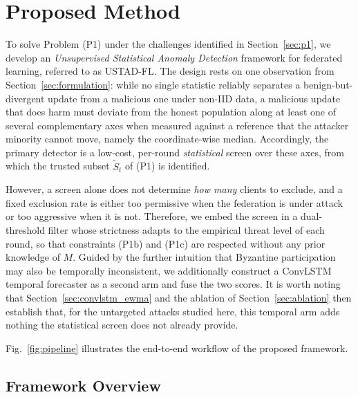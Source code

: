 \documentclass[journal]{IEEEtran}
\begin{document}
\section{Proposed Method}
\label{sec:method}

To solve Problem (P1) under the challenges identified in Section~\ref{sec:p1}, we develop an \emph{Unsupervised Statistical Anomaly Detection} framework for federated learning, referred to as USTAD-FL. The design rests on one observation from Section~\ref{sec:formulation}: while no single statistic reliably separates a benign-but-divergent update from a malicious one under non-IID data, a malicious update that does harm must deviate from the honest population along at least one of several complementary axes when measured against a reference that the attacker minority cannot move, namely the coordinate-wise median. Accordingly, the primary detector is a low-cost, per-round \emph{statistical} screen over these axes, from which the trusted subset $\widetilde{S}_t$ of (P1) is identified.

However, a screen alone does not determine \emph{how many} clients to exclude, and a fixed exclusion rate is either too permissive when the federation is under attack or too aggressive when it is not. Therefore, we embed the screen in a dual-threshold filter whose strictness adapts to the empirical threat level of each round, so that constraints (P1b) and (P1c) are respected without any prior knowledge of $M$. Guided by the further intuition that Byzantine participation may also be temporally inconsistent, we additionally construct a ConvLSTM temporal forecaster as a second arm and fuse the two scores. It is worth noting that Section~\ref{sec:convlstm_ewma} and the ablation of Section~\ref{sec:ablation} then establish that, for the untargeted attacks studied here, this temporal arm adds nothing the statistical screen does not already provide.

Fig.~\ref{fig:pipeline} illustrates the end-to-end workflow of the proposed framework.

\subsection{Framework Overview}
\end{document}
